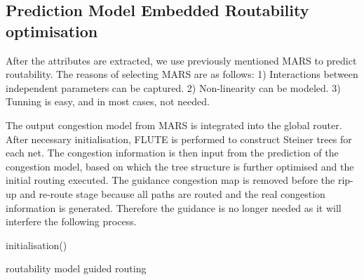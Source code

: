 \subsection{Prediction Model Embedded Routability optimisation}
After the attributes are extracted, we use previously mentioned MARS \cite{MARS} to predict routability. The reasons of selecting MARS are as follows: 1) Interactions between independent parameters can be captured. 2) Non-linearity can be modeled. 3) Tunning is easy, and in most cases, not needed. 

The output congestion model from MARS is integrated into the global router. After necessary initialisation, FLUTE is performed to construct Steiner trees for each net. The congestion information is then input from the prediction of the congestion model, based on which the tree structure is further optimised and the initial routing executed. The guidance congestion map is removed before the rip-up and re-route stage because all paths are routed and the real congestion information is generated. Therefore the guidance is no longer needed as it will interfere the following process.

\begin{algorithm}
\SetAlgoLined
{}
 initialisation()\;
 \caption{routability model guided routing}
\end{algorithm}
